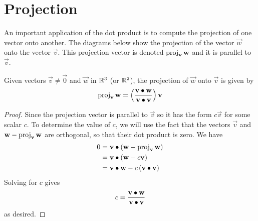 \documentclass[handout]{ximera}
\begin{document}
\section{Projection}

An important application of the dot product is to compute the projection of one vector onto another.
The diagrams below show the projection of the vector $\vec{w}$ onto the vector $\vec{v}$. 
This projection vector is denoted $\operatorname{proj}_{\mathbf{v}} \mathbf{w}$
and it is parallel to $\vec{v}$.

\begin{image}
\end{image}

\begin{proposition}
Given vectors $\vec{v} \neq \vec{0}$ and $\vec{w}$ in $\mathbb R^3$ (or $\mathbb R^2$), the projection of $\vec{w}$ onto $\vec{v}$ is given by
\[
\operatorname{proj}_{\mathbf{v}} \mathbf{w} = \left(\frac{\mathbf{v} \bullet \mathbf{w}}{\mathbf{v} \bullet \mathbf{v}}\right) \mathbf{v}
\]


\begin{proof}
Since the projection vector is parallel to $\vec{v}$ so it has the form $c \vec{v}$ for some scalar $c$.
To determine the value of $c$, we will use the fact that the vectors $\vec{v}$ and $\mathbf{w} - \operatorname{proj}_{\mathbf{v}} \mathbf{w}$ are orthogonal, 
so that their dot product is zero. We have
\begin{align*}
0 &= \mathbf{v} \bullet \left(\mathbf{w} - \operatorname{proj}_{\mathbf{v}} \mathbf{w} \right)\\
  &= \mathbf{v} \bullet \left(\mathbf{w} - c \mathbf{v}\right)\\
  &= \mathbf{v} \bullet \mathbf{w} - c \left( \mathbf{v} \bullet \mathbf{v} \right)
\end{align*}
Solving for $c$ gives
\[
c = \frac{\mathbf{v} \bullet \mathbf{w}}{\mathbf{v} \bullet \mathbf{v}}
\]
as desired.
\end{proof}
\end{proposition}
\end{document}
